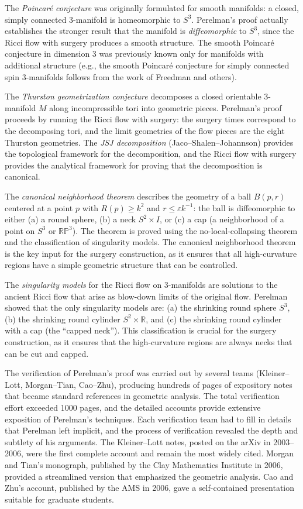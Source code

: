 The \emph{Poincar\'e conjecture} was originally formulated for smooth manifolds: a closed, simply connected 3-manifold is homeomorphic to $S^3$. Perelman's proof actually establishes the stronger result that the manifold is \emph{diffeomorphic} to $S^3$, since the Ricci flow with surgery produces a smooth structure. The smooth Poincar\'e conjecture in dimension 3 was previously known only for manifolds with additional structure (e.g., the smooth Poincar\'e conjecture for simply connected spin 3-manifolds follows from the work of Freedman and others).

The \emph{Thurston geometrization conjecture} decomposes a closed orientable 3-manifold $M$ along incompressible tori into geometric pieces. Perelman's proof proceeds by running the Ricci flow with surgery: the surgery times correspond to the decomposing tori, and the limit geometries of the flow pieces are the eight Thurston geometries. The \emph{JSJ decomposition} (Jaco--Shalen--Johannson) provides the topological framework for the decomposition, and the Ricci flow with surgery provides the analytical framework for proving that the decomposition is canonical.

The \emph{canonical neighborhood theorem} describes the geometry of a ball $B(p, r)$ centered at a point $p$ with $R(p) \ge k^2$ and $r \le \varepsilon k^{-1}$: the ball is diffeomorphic to either (a) a round sphere, (b) a neck $S^2 \times I$, or (c) a cap (a neighborhood of a point on $S^3$ or $\mathbb{RP}^3$). The theorem is proved using the no-local-collapsing theorem and the classification of singularity models. The canonical neighborhood theorem is the key input for the surgery construction, as it ensures that all high-curvature regions have a simple geometric structure that can be controlled.

The \emph{singularity models} for the Ricci flow on 3-manifolds are solutions to the ancient Ricci flow that arise as blow-down limits of the original flow. Perelman showed that the only singularity models are: (a) the shrinking round sphere $S^3$, (b) the shrinking round cylinder $S^2 \times \mathbb{R}$, and (c) the shrinking round cylinder with a cap (the ``capped neck''). This classification is crucial for the surgery construction, as it ensures that the high-curvature regions are always necks that can be cut and capped.

The verification of Perelman's proof was carried out by several teams (Kleiner--Lott, Morgan--Tian, Cao--Zhu), producing hundreds of pages of expository notes that became standard references in geometric analysis. The total verification effort exceeded 1000 pages, and the detailed accounts provide extensive exposition of Perelman's techniques. Each verification team had to fill in details that Perelman left implicit, and the process of verification revealed the depth and subtlety of his arguments. The Kleiner--Lott notes, posted on the arXiv in 2003--2006, were the first complete account and remain the most widely cited. Morgan and Tian's monograph, published by the Clay Mathematics Institute in 2006, provided a streamlined version that emphasized the geometric analysis. Cao and Zhu's account, published by the AMS in 2006, gave a self-contained presentation suitable for graduate students.


